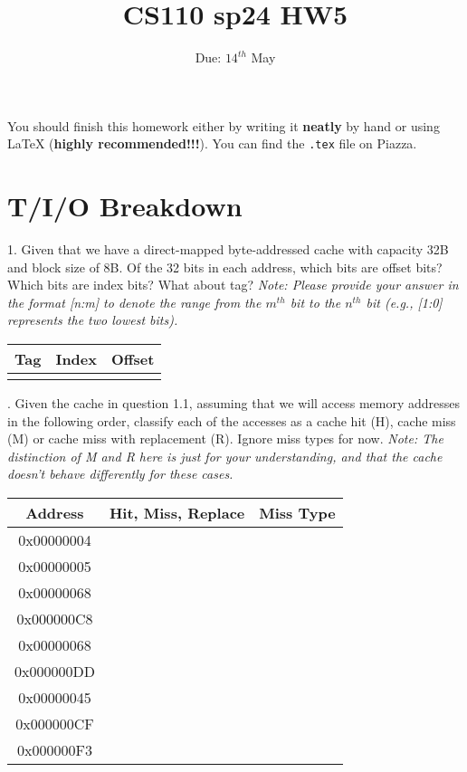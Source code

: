 \documentclass{article}
\title{CS110 sp24 HW5}
\date{Due: $14^{th}$ May}
\begin{document}
\maketitle

You should finish this homework either by writing it \textbf{neatly} by hand or using LaTeX (\textbf{highly recommended!!!}). You can find the \texttt{.tex} file on Piazza.
\section{T/I/O Breakdown}
1. Given that we have a direct-mapped byte-addressed cache with capacity 32B and block size of 8B. Of the 32 bits in each address, which bits are offset bits? Which bits are index bits? What about tag? \textit{Note: Please provide your answer in the format [n:m] to denote the range from the $m^{th}$ bit to the $n^{th}$ bit (e.g., [1:0] represents the two lowest bits).}
\begin{table}[H]
    \centering
    \ttfamily
    \Large
    \setlength{\tabcolsep}{12pt}
    \begin{tabular}{|c|c|c|}
        \hline
        Tag & Index & Offset \\
        \hline
         &  & \\ \hline
    \end{tabular}
\end{table}

. Given the cache in question 1.1, assuming that we will access memory addresses in the following order, classify each of the accesses as a cache hit (H), cache miss (M) or cache miss with replacement (R). Ignore miss types for now.
\textit{Note: The distinction of M and R here is just for your understanding, and that the cache doesn't behave differently for these cases.}
\begin{table}[H]
    \centering
    \ttfamily
    \begin{tabular}{|c|c|c|}
        \hline
        Address & Hit, Miss, Replace & Miss Type \\ \hline
        0x00000004 & & \\ \hline
        0x00000005 & & \\ \hline
        0x00000068 & & \\ \hline
        0x000000C8 & & \\ \hline
        0x00000068 & & \\ \hline
        0x000000DD & & \\ \hline
        0x00000045 & & \\ \hline
        0x000000CF & & \\ \hline
        0x000000F3 & & \\ \hline
    \end{tabular}
\end{table}
\end{document}
